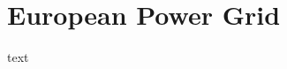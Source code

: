 \documentclass[../document.tex]{subfiles}
\begin{document}
\section{European Power Grid}
text
\end{document}
